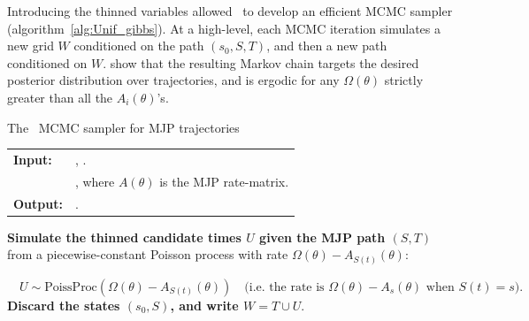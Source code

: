 Introducing the thinned variables allowed~\cite{RaoTeh13} to develop an efficient MCMC sampler (algorithm~\ref{alg:Unif_gibbs}). 
At a high-level, each MCMC iteration simulates a new grid $W$ conditioned on the path $(s_0,S,T)$, and then a new path conditioned on $W$. 
\cite{RaoTeh13} show that the resulting Markov chain targets the desired posterior distribution over trajectories, and is ergodic for any $\Omega(\theta)$ strictly greater than all the $A_i(\theta)$'s. 
\begin{algorithm}[H]
  \caption{The~\cite{RaoTeh13} MCMC sampler for MJP trajectories}
   \label{alg:Unif_gibbs}
  \begin{tabular}{l l}
   \textbf{Input:  } & \text{Prior $\pi_0$, observations $X$}, 
                       \text{the previous path $S(t) = (s_0, S, T)$}.\\ 
                     & \text{Parameter $\Omega(\theta) > \max_i A_i(\theta)$}, where
                     $A(\theta)$ is the MJP rate-matrix.\\
   \textbf{Output:  }& \text{New MJP trajectory $S' (t) = (s'_0, S', T')$}.\\
   \hline
   \end{tabular}
   \begin{algorithmic}[1]
\State \textbf{ Simulate the thinned candidate times $U$ given the MJP path $(S,T)$ } 
from a piecewise-constant Poisson process with rate $\Omega(\theta)-A_{S(t)}(\theta)$: 

$ \quad  U \sim \text{PoissProc}(\Omega(\theta) - A_{S(t)}(\theta))  \quad \text{(i.e.\ the rate is $\Omega(\theta)-A_s(\theta)$ when $S(t) = s$).}$
\State \textbf{
  Discard the states $(s_0,S)$, and write %
  $W = T \cup U$}.


\end{algorithmic}
\end{algorithm}
